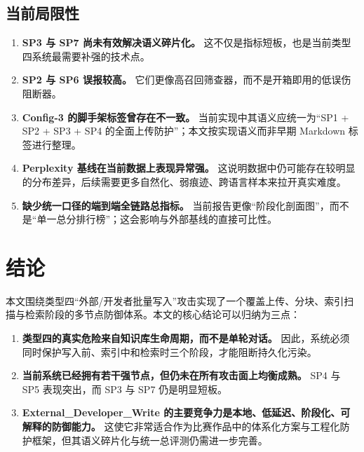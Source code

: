 \documentclass[11pt,a4paper]{ctexart}
\begin{document}
\subsection{当前局限性}
\begin{enumerate}[leftmargin=2em]
  \item \textbf{SP3 与 SP7 尚未有效解决语义碎片化。} 这不仅是指标短板，也是当前类型四系统最需要补强的技术点。
  \item \textbf{SP2 与 SP6 误报较高。} 它们更像高召回筛查器，而不是开箱即用的低误伤阻断器。
  \item \textbf{Config-3 的脚手架标签曾存在不一致。} 当前实现中其语义应统一为“SP1 + SP2 + SP3 + SP4 的全面上传防护”；本文按实现语义而非早期 Markdown 标签进行整理。
  \item \textbf{Perplexity 基线在当前数据上表现异常强。} 这说明数据中仍可能存在较明显的分布差异，后续需要更多自然化、弱痕迹、跨语言样本来拉开真实难度。
  \item \textbf{缺少统一口径的端到端全链路总指标。} 当前报告更像“阶段化剖面图”，而不是“单一总分排行榜”；这会影响与外部基线的直接可比性。
\end{enumerate}

\section{结论}
本文围绕类型四“外部/开发者批量写入”攻击实现了一个覆盖上传、分块、索引扫描与检索阶段的多节点防御体系。本文的核心结论可以归纳为三点：
\begin{enumerate}[leftmargin=2em]
  \item \textbf{类型四的真实危险来自知识库生命周期，而不是单轮对话。} 因此，系统必须同时保护写入前、索引中和检索时三个阶段，才能阻断持久化污染。
  \item \textbf{当前系统已经拥有若干强节点，但仍未在所有攻击面上均衡成熟。} SP4 与 SP5 表现突出，而 SP3 与 SP7 仍是明显短板。
  \item \textbf{External\_Developer\_Write 的主要竞争力是本地、低延迟、阶段化、可解释的防御能力。} 这使它非常适合作为比赛作品中的体系化方案与工程化防护框架，但其语义碎片化与统一总评测仍需进一步完善。
\end{enumerate}
\end{document}
